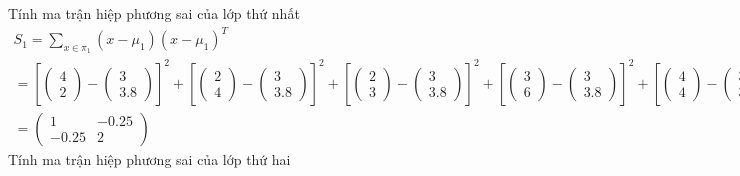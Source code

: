 \documentclass{article}
\begin{document}
	Tính ma trận hiệp phương sai của lớp thứ nhất
	\begin{gather*}
		S_1 = \sum_{x \in \pi_1}(x - \mu_1)(x - \mu_1)^T\\
		= \left[\begin{pmatrix}4\\2\end{pmatrix} - \begin{pmatrix}3\\3.8\end{pmatrix}\right]^2
		+ \left[\begin{pmatrix}2\\4\end{pmatrix} - \begin{pmatrix}3\\3.8\end{pmatrix}\right]^2
		+ \left[\begin{pmatrix}2\\3\end{pmatrix} - \begin{pmatrix}3\\3.8\end{pmatrix}\right]^2
		+ \left[\begin{pmatrix}3\\6\end{pmatrix} - \begin{pmatrix}3\\3.8\end{pmatrix}\right]^2
		+ \left[\begin{pmatrix}4\\4\end{pmatrix} - \begin{pmatrix}3\\3.8\end{pmatrix}\right]^2
		\\
		= \begin{pmatrix}1 & -0.25\\-0.25 & 2\end{pmatrix}
	\end{gather*}
	Tính ma trận hiệp phương sai của lớp thứ hai
\end{document}
